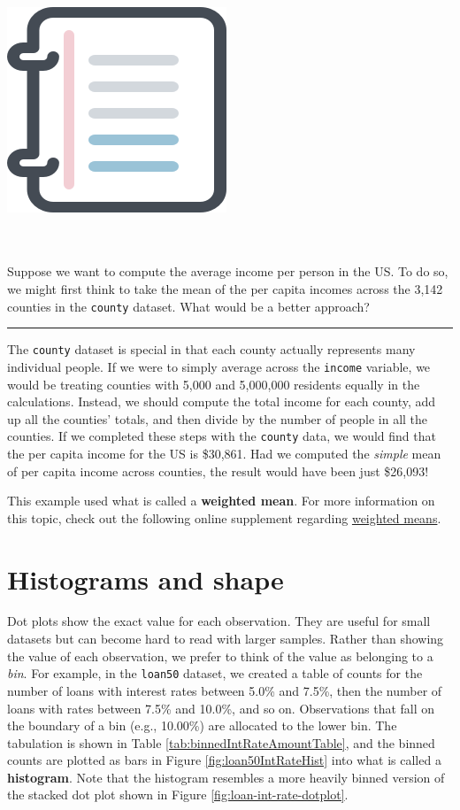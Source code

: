 \documentclass[
  10pt,
  openany]{book}
\newenvironment{mdframedwithfootGPWE}
{   
    \savenotes
    \begin{mdframed}[%
    topline=true, bottomline=true, linecolor=oiB, linewidth=0.5pt,
    rightline=false, leftline=false,
    backgroundcolor=oiLGray]
    \renewcommand{\thempfootnote}{\arabic{footnote}}
    }
{
    \end{mdframed}
    \spewnotes
}
\newenvironment{workedexample}{
    \let\oldrule\rule
    \renewcommand{\rule}[2]{\vspace{-2mm}\oldrule{##1}{##2}\vspace{-2mm}}
\vspace{4mm}
\begin{mdframedwithfootGPWE}
\begin{minipage}[t]{0.10\textwidth}
{$\:$ \\ \setkeys{Gin}{width=2.5em,keepaspectratio}\includegraphics{images/_icons/worked-example.png}}
\end{minipage}
\hfill
\begin{minipage}[t]{0.90\textwidth}
\vspace{-2mm}
\setlength{\parskip}{1em}
\noindent\textbf{\color{oiB}\small\fontfamily{phv}\selectfont{\MakeUppercase{Example}}} $\:$ \\ \\
}{\end{minipage}
\end{mdframedwithfootGPWE}
\vspace{4mm}
}
\begin{document}
\begin{workedexample}
Suppose we want to compute the average income per person in the US.
To do so, we might first think to take the mean of the per capita incomes across the 3,142 counties in the \texttt{county} dataset.
What would be a better approach?

\begin{center}\rule{0.5\linewidth}{0.5pt}\end{center}

The \texttt{county} dataset is special in that each county actually represents many individual people.
If we were to simply average across the \texttt{income} variable, we would be treating counties with 5,000 and 5,000,000 residents equally in the calculations.
Instead, we should compute the total income for each county, add up all the counties' totals, and then divide by the number of people in all the counties.
If we completed these steps with the \texttt{county} data, we would find that the per capita income for the US is \$30,861.
Had we computed the \emph{simple} mean of per capita income across counties, the result would have been just \$26,093!

This example used what is called a \textbf{weighted mean}.
For more information on this topic, check out the following online supplement regarding \href{https://www.openintro.org/go/?id=stat_extra_weighted_mean}{weighted means}.

\end{workedexample}

\hypertarget{histograms}{%
\section{Histograms and shape}\label{histograms}}

Dot plots show the exact value for each observation.
They are useful for small datasets but can become hard to read with larger samples.
Rather than showing the value of each observation, we prefer to think of the value as belonging to a \emph{bin}.
For example, in the \texttt{loan50} dataset, we created a table of counts for the number of loans with interest rates between 5.0\% and 7.5\%, then the number of loans with rates between 7.5\% and 10.0\%, and so on.
Observations that fall on the boundary of a bin (e.g., 10.00\%) are allocated to the lower bin.
The tabulation is shown in Table \ref{tab:binnedIntRateAmountTable}, and the binned counts are plotted as bars in Figure \ref{fig:loan50IntRateHist} into what is called a \textbf{histogram}.
Note that the histogram resembles a more heavily binned version of the stacked dot plot shown in Figure \ref{fig:loan-int-rate-dotplot}.
\end{document}
